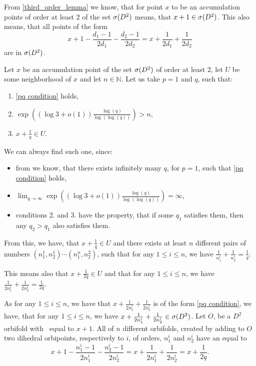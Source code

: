 From \ref{third_order_lemma} we know, that for point $x$ to be an accumulation points of order 
at least $2$ of the set ${{\sigma}(D^2)}$ means, that $x + 1 \in {{\sigma}(D^2)}$. This also means, that 
all points of the form 
\begin{equation}\label{pq condition}
x + 1 - \frac{d_1-1}{2d_1} - \frac{d_2-1}{2d_2} = x + \frac{1}{2d_1} + \frac{1}{2d_2}
\end{equation} 
are in ${{\sigma}(D^2)}$. 

Let $x$ be an accumulation point of the set ${{\sigma}(D^2)}$ of order at least $2$, let $U$ be 
some neighborhood of $x$ and let $n \in \mathbb{N}$. Let us take $p = 1$ and $q$, such that:
\begin{enumerate} \label{choice for q}
\item \ref{pq condition} holds, 
\item$\exp\left((\log{3}+o(1))\frac{\log(q)}{\log(\log(q))}\right) > n$,
\item $x + \frac{1}{q} \in U$. 
\end{enumerate}
We can always find such one, since:
\begin{itemize} 
\item from \cite{Browning2011} we know, that there exists 
infinitely many $q$, for $p = 1$, such that \ref{pq condition} holds, 
\item
$\lim_{q \to \infty }\exp\left((\log{3}+o(1))\frac{\log(q)}{\log(\log(q))}\right) = \infty$,
\item conditions 2. and 3. have the property, that if some $q_1$ satisfies them, 
then any $q_2 > q_1$ also satisfies them. 
\end{itemize}
From this, we have, that $x + \frac{1}{q} \in U$ and there exists at least $n$ different pairs of numbers $(n_1^1, n_2^1)\cdots (n_1^n, n_2^2)$, such that for any $1 \leq i \leq n$, we have 
$\frac{1}{n_1^i}+\frac{1}{n_2^i} = \frac{1}{q}$. 

This means also that $x + \frac{1}{2q} \in U$ and that for any $1 \leq i \leq n$, we have 
$\frac{1}{2n_1^i}+\frac{1}{2n_2^i} = \frac{1}{2q}$. 

As for any $1 \leq i \leq n$, we have that  $x + \frac{1}{2n_1^i}+\frac{1}{2n_2^i}$ 
is of the form \ref{pq condition}, we have, that for any $1 \leq i \leq n$, we have 
$x + \frac{1}{2n_1^i}+\frac{1}{2n_2^i} \in {{\sigma}(D^2)}$. 
Let $O$, be a $D^2$ orbifold with 
\Eoc\ equal to $x+1$. All of $n$ different orbifolds, created by adding to $O$ two dihedral 
orbipoints, respectively to $i$, of orders, $n_1^i$ and $n_2^i$ have an \Eoc equal to 
\begin{equation}
x + 1 - \frac{n_1^i-1}{2n_1^i} - \frac{n_2^i-1}{2n_2^i} = 
x + \frac{1}{2n_1^i} + \frac{1}{2n_2^i} = x + \frac{1}{2q}.
\end{equation} 

